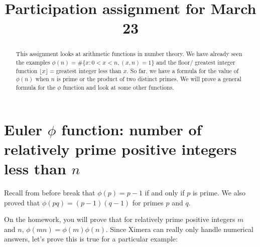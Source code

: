 \documentclass{ximera}
\title{Participation assignment for March 23}
\begin{document}
  
\begin{abstract}  
This assignment looks at arithmetic functions in number theory. We have already seen the examples $\phi(n)=\#\{x: 0<x< n, (x,n)=1\}$ and the floor/ greatest integer function $\lfloor x \rfloor=$greatest integer less than $x$. So far, we have a formula for the value of $\phi(n)$ when $n$ is prime or the product of two distinct primes. We will prove a general formula for the $\phi$ function and look at some other functions.
\end{abstract}  
\maketitle  

\section{Euler $\phi$ function: number of relatively prime positive integers less than $n$}
Recall from before break that $\phi(p)=p-1$ if and only if $p$ is prime. We also proved that $\phi(pq)=(p-1)(q-1)$ for primes $p$ and $q$. 

On the homework, you will prove that for relatively prime positive integers $m$ and $n$,  $\phi(mn)=\phi(m)\phi(n)$. Since Ximera can really only handle numerical answers, let's prove this is true for a particular example:
\end{document}
